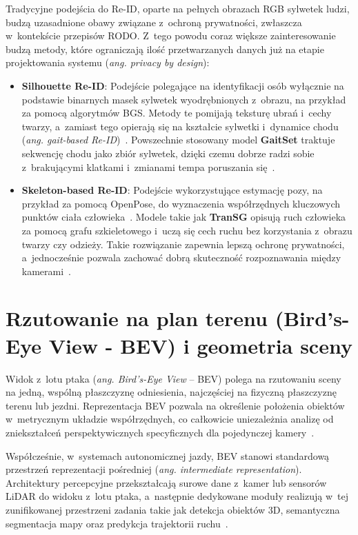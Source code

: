 Tradycyjne podejścia do Re-ID, oparte na pełnych obrazach RGB sylwetek ludzi, budzą uzasadnione
obawy związane z~ochroną prywatności, zwłaszcza w~kontekście przepisów RODO. Z~tego powodu coraz
większe zainteresowanie budzą metody, które ograniczają ilość przetwarzanych danych już na etapie
projektowania systemu (\textit{ang. privacy by design}):
\begin{itemize}
  \item \textbf{Silhouette Re-ID}: Podejście polegające na identyfikacji osób wyłącznie na podstawie binarnych masek sylwetek wyodrębnionych z~obrazu, na przykład za pomocą algorytmów BGS. Metody te pomijają teksturę ubrań i~cechy twarzy, a~zamiast tego opierają się na kształcie sylwetki i~dynamice chodu (\textit{ang. gait-based Re-ID})~\cite{chao2019gaitset}. Powszechnie stosowany model \textbf{GaitSet} traktuje sekwencję chodu jako zbiór sylwetek, dzięki czemu dobrze radzi sobie z~brakującymi klatkami i~zmianami tempa poruszania się~\cite{chao2019gaitset}.
  \item \textbf{Skeleton-based Re-ID}: Podejście wykorzystujące estymację pozy, na przykład za pomocą OpenPose, do wyznaczenia współrzędnych kluczowych punktów ciała człowieka~\cite{rao2023}. Modele takie jak \textbf{TranSG} opisują ruch człowieka za pomocą grafu szkieletowego i~uczą się cech ruchu bez korzystania z~obrazu twarzy czy odzieży. Takie rozwiązanie zapewnia lepszą ochronę prywatności, a~jednocześnie pozwala zachować dobrą skuteczność rozpoznawania między kamerami~\cite{rao2023}.
\end{itemize}

\section{Rzutowanie na plan terenu (Bird’s-Eye View - BEV) i geometria sceny}

Widok z~lotu ptaka (\textit{ang. Bird's-Eye View} -- BEV) polega na rzutowaniu sceny na jedną,
wspólną płaszczyznę odniesienia, najczęściej na fizyczną płaszczyznę terenu lub jezdni.
Reprezentacja BEV pozwala na określenie położenia obiektów w~metrycznym układzie współrzędnych, co
całkowicie uniezależnia analizę od zniekształceń perspektywicznych specyficznych dla pojedynczej
kamery~\cite{fleuret2008, li2023}.

Współcześnie, w~systemach autonomicznej jazdy, BEV stanowi standardową przestrzeń reprezentacji
pośredniej (\textit{ang. intermediate representation}). Architektury percepcyjne przekształcają
surowe dane z~kamer lub sensorów LiDAR do widoku z~lotu ptaka, a~następnie dedykowane moduły
realizują w~tej zunifikowanej przestrzeni zadania takie jak detekcja obiektów 3D, semantyczna
segmentacja mapy oraz predykcja trajektorii ruchu~\cite{li2023, zhao2024}.

